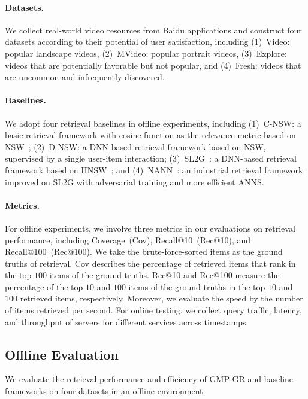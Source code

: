 \paragraph{Datasets.}\label{gmpgr:sec:dataset}
We collect real-world video resources from Baidu applications and construct four datasets according to their potential of user satisfaction, including (1)~Video: popular landscape videos, (2)~MVideo: popular portrait videos, (3)~Explore: videos that are potentially favorable but not popular, and (4)~Fresh: videos that are uncommon and infrequently discovered.

\paragraph{Baselines.}
We adopt four retrieval baselines in offline experiments, including
(1)~C-NSW: a basic retrieval framework with cosine function as the relevance metric based on NSW~\cite{malkov2014approximate};
(2)~D-NSW: a DNN-based retrieval framework based on NSW, supervised by a single user-item interaction;
(3)~SL2G~\cite{tan2020fast}: a DNN-based retrieval framework based on HNSW~\cite{malkov2018efficient};
and (4)~NANN~\cite{chen2022approximate}: an industrial retrieval framework improved on SL2G with adversarial training and more efficient ANNS.

\paragraph{Metrics.}
For offline experiments, we involve three metrics in our evaluations on retrieval performance, including Coverage~(Cov), Recall@10~(Rec@10), and Recall@100~(Rec@100).
We take the brute-force-sorted items as the ground truths of retrieval.
Cov describes the percentage of retrieved items that rank in the top $100$ items of the ground truths.
Rec@10 and Rec@100 measure the percentage of the top $10$ and $100$ items of the ground truths in the top $10$ and $100$ retrieved items, respectively.
Moreover, we evaluate the speed by the number of items retrieved per second. For online testing, we collect query traffic, latency, and throughput of servers for different services across timestamps.


\subsection{Offline Evaluation}

We evaluate the retrieval performance and efficiency of GMP-GR and baseline frameworks on four datasets in an offline environment.

